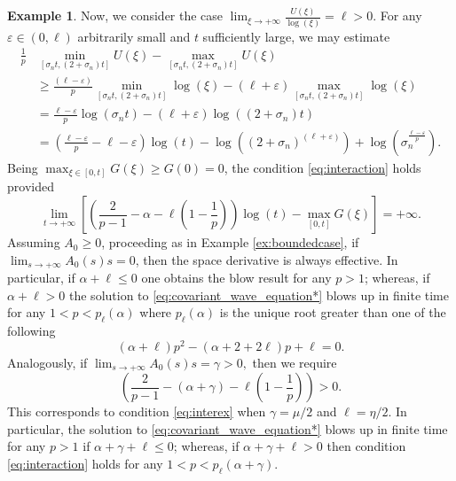 \documentclass[11pt,reqno]{amsart}
\theoremstyle{definition}
\newtheorem{example}{Example}
\numberwithin{equation}{section}
\newcommand{\eps}{\varepsilon}
\begin{document}
\begin{example}\label{ex:4}
Now, we consider the case $\displaystyle{\lim_{\xi\to +\infty}\frac{U(\xi)}{\log(\xi)}}=\ell>0$.
For any $\varepsilon\in (0,\ell)$ arbitrarily small and $t$ sufficiently large, we may estimate
\begin{align*}
\frac{1}{p} &\min_{[\sigma_n t,(2+\sigma_n)t]} U(\xi) -\max_{[\sigma_n t,(2+\sigma_n)t]} U(\xi) \\
 &   \geq 
    \frac{(\ell-\varepsilon) }{p} \min_{[\sigma_n t,(2+\sigma_n)t]} \log (\xi) - (\ell+\varepsilon) \max_{[\sigma_n t,(2+\sigma_n)t]} \log (\xi) \\
 &   = 
    \frac{\ell-\varepsilon }{p} \log (\sigma_n t) - (\ell+\varepsilon) \log ((2+\sigma_n)t)\\
& = \left(\frac{\ell-\eps}{p}-\ell-\eps\right)\log(t)- \log\left((2+\sigma_n)^{(\ell+\varepsilon)}\right)+\log\left(\sigma_n^\frac{\ell-\varepsilon}{p}\right).
    \end{align*}
Being $\displaystyle{\max_{\xi\in [0,t]}G(\xi)}\geq G(0)=0$, the condition \eqref{eq:interaction} holds provided
\begin{equation}
\label{eq:interaction_bounded}
    \lim_{t\to+\infty} \left[\left(\frac{2}{p-1}-\alpha-\ell\left(1-\frac{1}{p}\right)\right)\log(t)-\max_{[0,t]}G(\xi)\right]
    =+\infty.
\end{equation}
%
Assuming $A_0\geq 0$, proceeding as in Example \ref{ex:boundedcase}, if  $\displaystyle{\lim_{s\to +\infty}}A_0(s)s=0$, then the space derivative is always effective. In particular, if $\alpha+\ell\leq 0$ one obtains the blow result for any $p>1$; whereas, if $\alpha+\ell> 0$ the solution to \eqref{eq:covariant_wave_equation*} blows up in finite time for any $1<p<p_\ell(\alpha)$ where $p_\ell(\alpha)$ is the unique root greater than one of the following 
%
\begin{equation}
(\alpha+\ell)p^2-(\alpha+2+2\ell)p+\ell=0.
\end{equation}
%
Analogously, if $\displaystyle{\lim_{s\to +\infty}}A_0(s)s=\gamma>0,$ then we require  
\begin{equation}
\left(\frac{2}{p-1}-\left(\alpha+\gamma\right)-\ell\left(1-\frac{1}{p}\right)\right)>0.
\end{equation}
This corresponds to condition \eqref{eq:interex} when $\gamma=\mu/2$ and $\ell=\eta/2$. In particular, the solution to \eqref{eq:covariant_wave_equation*} blows up in finite time for any $p>1$ if $\alpha+\gamma+\ell\leq 0$; whereas, if $\alpha+\gamma+\ell>0$ then condition \eqref{eq:interaction} holds for any $1<p<p_\ell(\alpha+\gamma)$.


\end{example}
\end{document}
